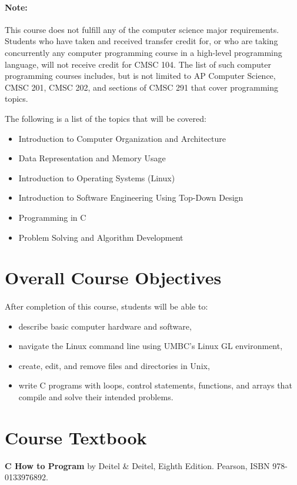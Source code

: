\documentclass[letter,11pt]{article}
\begin{document}
\paragraph{Note:}This course does not fulfill any of the computer science major requirements. Students who have taken and received transfer credit for, or who are taking concurrently any computer programming course in a high-level programming language, will not receive credit for CMSC 104. The list of such computer programming courses includes, but is not limited to AP Computer Science, CMSC 201, CMSC 202, and sections of CMSC 291 that cover programming topics.

The following is a list of the topics that will be covered:
\begin{itemize}
\item Introduction to Computer Organization and Architecture
\item Data Representation and Memory Usage
\item Introduction to Operating Systems (Linux)
\item Introduction to Software Engineering Using Top-Down Design
\item Programming in C
\item Problem Solving and Algorithm Development
\end{itemize}

\section*{Overall Course Objectives}
\paragraph{}After completion of this course, students will be able to:
\begin{multicols}{2}
\begin{itemize}
    \item describe basic computer hardware and software,
    \item navigate the Linux command line using UMBC's Linux GL environment,
    \item create, edit, and remove files and directories in Unix,
    \item write C programs with loops, control statements, functions, and arrays that compile and solve their intended problems.
\end{itemize}
\end{multicols}

\section*{Course Textbook}
\textbf{C How to Program} by Deitel \& Deitel, Eighth Edition. Pearson, ISBN 978-0133976892.
\end{document}
